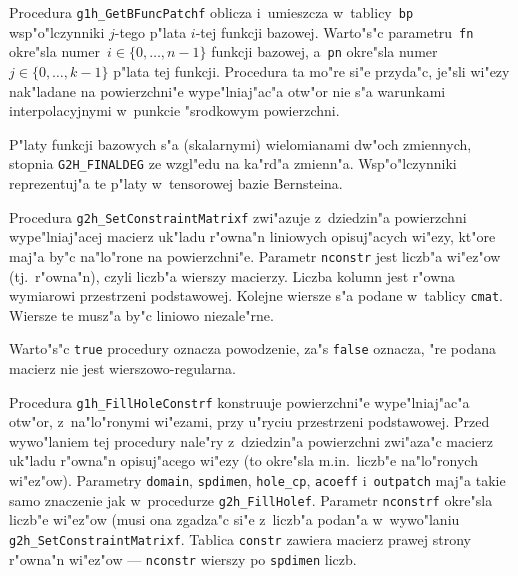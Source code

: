\vspace{\bigskipamount}
Procedura \texttt{g1h\_GetBFuncPatchf} oblicza i~umieszcza w~tablicy~\texttt{bp}
wsp"o"lczynniki $j$-tego p"lata $i$-tej funkcji bazowej. Warto"s"c
parametru~\texttt{fn} okre"sla numer~$i\in\{0,\ldots,n-1\}$ funkcji bazowej,
a~\texttt{pn} okre"sla numer~$j\in\{0,\ldots,k-1\}$ p"lata tej funkcji.
Procedura ta mo"re si"e przyda"c, je"sli wi"ezy nak"ladane na powierzchni"e
wype"lniaj"ac"a otw"or nie s"a warunkami interpolacyjnymi w~punkcie "srodkowym
powierzchni.

\begin{sloppypar}
P"laty funkcji bazowych s"a (skalarnymi) wielomianami dw"och zmiennych, stopnia
\texttt{G2H\_FINALDEG} ze wzgl"edu na ka"rd"a zmienn"a. Wsp"o"lczynniki
reprezentuj"a te p"laty w~tensorowej bazie Bernsteina.%
\end{sloppypar}

\vspace{\bigskipamount}
Procedura \texttt{g2h\_SetConstraintMatrixf} zwi"azuje z~dziedzin"a
powierzchni wype"lniaj"acej macierz uk"ladu r"owna"n liniowych opisuj"acych
wi"ezy, kt"ore maj"a by"c na"lo"rone na powierzchni"e.
Parametr \texttt{nconstr} jest liczb"a wi"ez"ow (tj.\ r"owna"n), czyli liczb"a
wierszy macierzy. Liczba kolumn jest r"owna wymiarowi przestrzeni podstawowej.
Kolejne wiersze s"a podane w~tablicy \texttt{cmat}. Wiersze te musz"a by"c
liniowo niezale"rne.

Warto"s"c \texttt{true} procedury oznacza powodzenie, za"s \texttt{false}
oznacza, "re podana macierz nie jest wierszowo-regularna.

\vspace{\bigskipamount}
Procedura \texttt{g1h\_FillHoleConstrf} konstruuje powierzchni"e wype"lniaj"ac"a
otw"or, z~na"lo"ronymi wi"ezami, przy u"ryciu przestrzeni podstawowej.
Przed wywo"laniem tej procedury nale"ry z~dziedzin"a powierzchni zwi"aza"c
macierz uk"ladu r"owna"n opisuj"acego wi"ezy (to okre"sla m.in.\ liczb"e
na"lo"ronych wi"ez"ow). Parametry \texttt{domain}, \texttt{spdimen},
\texttt{hole\_cp}, \texttt{acoeff} i~\texttt{outpatch} maj"a takie samo znaczenie
jak w~procedurze \texttt{g2h\_FillHolef}. Parametr \texttt{nconstrf} okre"sla
liczb"e wi"ez"ow (musi ona zgadza"c si"e z~liczb"a podan"a w~wywo"laniu
\texttt{g2h\_SetConstraintMatrixf}. Tablica \texttt{constr} zawiera
macierz prawej strony r"owna"n wi"ez"ow --- \texttt{nconstr} wierszy po
\texttt{spdimen} liczb.

